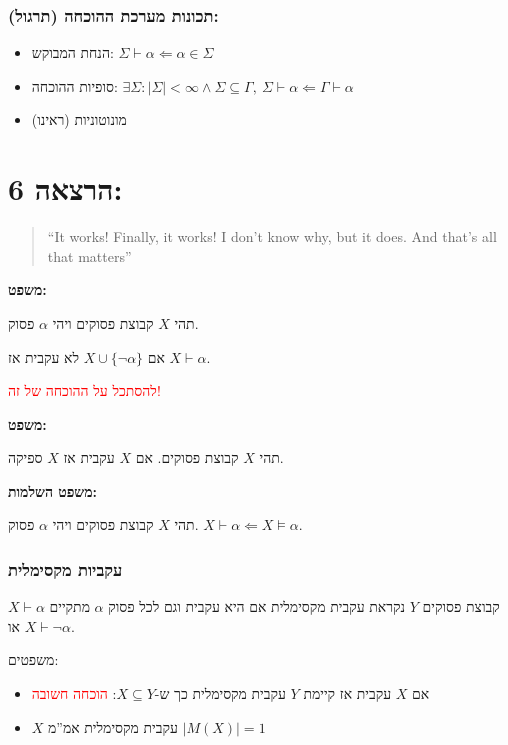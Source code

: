 \documentclass[12pt,a4paper]{article}
\begin{document}
\subsubsection*{תכונות מערכת ההוכחה (תרגול):}

\begin{itemize}
  \item הנחת המבוקש: $\Sigma\vdash\alpha\Leftarrow\alpha\in\Sigma$
  \item סופיות ההוכחה: $\exists\Sigma:|\Sigma|<\infty\wedge\Sigma\subseteq\Gamma,\ \Sigma\vdash\alpha\Leftarrow\Gamma\vdash\alpha$
  \item מונוטוניות (ראינו)
\end{itemize}

\section*{הרצאה 6:}

\begin{quote}
\textenglish{``It works! Finally, it works! I don't know why, but it does. And that's all that matters''}
\end{quote}

\textbf{משפט:}

תהי $X$ קבוצת פסוקים ויהי $\alpha$ פסוק.

אם $X\cup\{\lnot\alpha\}$ לא עקבית אז $X\vdash\alpha$.

\textcolor{red}{להסתכל על ההוכחה של זה!}

\textbf{משפט:}

תהי $X$ קבוצת פסוקים. אם $X$ עקבית אז $X$ ספיקה.

\textbf{משפט השלמות:}

תהי $X$ קבוצת פסוקים ויהי $\alpha$ פסוק. $X\vdash\alpha\Leftarrow X\vDash\alpha$.

\subsubsection*{עקביות מקסימלית}

קבוצת פסוקים $Y$ נקראת עקבית מקסימלית אם היא עקבית וגם לכל פסוק $\alpha$ מתקיים $X\vdash\alpha$ או $X\vdash\lnot\alpha$.

משפטים:

\begin{itemize}
  \item אם $X$ עקבית אז קיימת $Y$ עקבית מקסימלית כך ש-$X\subseteq Y$: \textcolor{red}{הוכחה חשובה}
  \item $X$ עקבית מקסימלית אמ''מ $|M(X)|=1$
\end{itemize}
\end{document}
